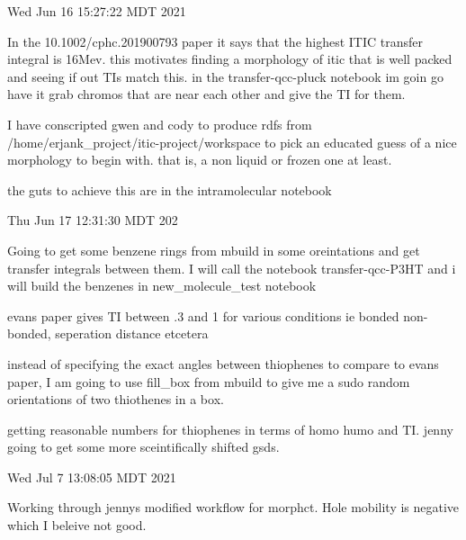 
Wed Jun 16 15:27:22 MDT 2021
    
       In the 10.1002/cphc.201900793 paper it says that the highest ITIC transfer integral 
       is 16Mev. this motivates finding a morphology of itic that is well packed and 
       seeing if out TIs match this. in the transfer-qcc-pluck notebook im goin go 
       have it grab chromos that are near each other and give the TI for them.
    
        I have conscripted gwen and cody to produce rdfs from /home/erjank_project/itic-project/workspace 
        to pick an educated guess of a nice morphology to begin with. that is, a non liquid or frozen one
        at least.

        the guts to achieve this are in the intramolecular notebook

Thu Jun 17 12:31:30 MDT 202

      Going to get some benzene rings from mbuild in some oreintations and get transfer integrals 
      between them. I will call the notebook transfer-qcc-P3HT and i will build the benzenes in 
      new_molecule_test notebook

      evans paper gives TI between .3 and 1 for various conditions ie bonded non-bonded, seperation
      distance etcetera

      instead of specifying the exact angles between thiophenes to compare to evans paper,
      I am going to use fill_box from mbuild to give me a sudo random orientations of two
      thiothenes in a box.

      getting reasonable numbers for thiophenes in terms of homo humo and TI. jenny going to get
      some more sceintifically shifted gsds.
      

Wed Jul  7 13:08:05 MDT 2021

      Working through jennys modified workflow for morphct. Hole mobility is negative which I beleive
      not good.
